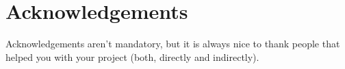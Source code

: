 \section{Acknowledgements}

Acknowledgements aren't mandatory, but it is always nice to thank people that helped you with your project (both, directly and indirectly).
